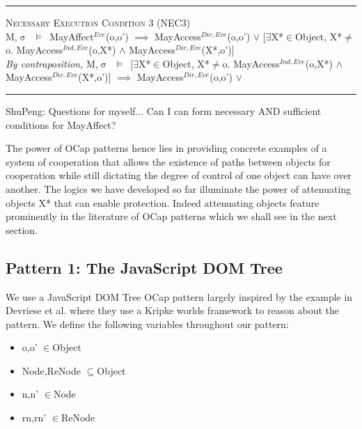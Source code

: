 \documentclass[a4paper,11pt, twoside,twocolumn]{article}
\newenvironment{logic}[1][null]
{\begin{flushleft} \small \label{#1}}
{\end{flushleft}}
\newcommand{\loin}{$\in$}
\newcommand{\loexists}{$\exists$}
\newcommand{\loand}{$\land$}
\newcommand{\loor} {$\lor$}
\newcommand{\loneq} {$\neq$}
\newcommand{\losubseteq}{$\subseteq$}
\newcommand{\loimplies}{$\implies$}
\newcommand{\losigma}{$\upsigma$}
\newcommand{\loturns} {$\vDash$}
\newcommand{\ablock} {\null\qquad}
\begin{document}
\begin{logic}
\hrule\null
\textsc{\normalsize *Necessary Execution Condition 3 (NEC3)}\\
M,\losigma\ \loturns\ MayAffect$^{Eve}$(o,o') \loimplies\linebreak
	\ablock MayAccess$^{Dir,Eve}$(o,o') \loor \linebreak
	\ablock $[$\loexists X*\loin Object, X*\loneq o. MayAccess$^{Ind,Eve}$(o,X*) \loand\linebreak
	\ablock \ablock MayAccess$^{Dir,Eve}$(X*,o')$]$
	\linebreak\\
\textit{By contraposition,}\linebreak
M,\losigma\ \loturns\ $[$\loexists X*\loin Object, X*\loneq o. MayAccess$^{Ind,Eve}$(o,X*) \linebreak
\ablock \loand MayAccess$^{Dir,Eve}$(X*,o')] \loimplies \linebreak
		\ablock MayAccess$^{Dir,Eve}$(o,o') \loor \linebreak
	\ablock 
\hrule
\end{logic}

ShuPeng: Questions for myself...
Can I can form necessary AND sufficient conditions for MayAffect?

The power of OCap patterns hence lies in providing concrete examples of a system of cooperation that allows the existence of paths between objects for cooperation while still dictating the degree of control of one object can have over another. The logics we have developed so far illuminate the power of attenuating objects X* that can enable protection. Indeed attenuating objects feature prominently in the literature of OCap patterns which we shall see in the next section.


\subsection{Pattern 1: The JavaScript DOM Tree}
We use a JavaScript DOM Tree OCap pattern largely inspired by the example in Devriese et al.\cite{devriese2016} where they use a Kripke worlds framework to reason about the pattern. We define the following variables throughout our pattern:
\begin{itemize}
\item o,o' \loin Object
\item Node,ReNode \losubseteq Object
\item n,n' \loin Node
\item rn,rn' \loin ReNode
\end{itemize}
\end{document}

